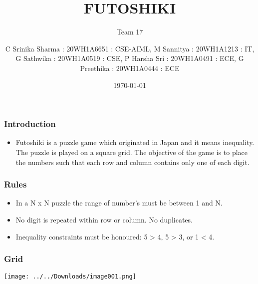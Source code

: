 \documentclass[14pt]{beamer}
\title{FUTOSHIKI}
\subtitle{Team 17}
\date{\today}
\author[14pt]{C Srinika Sharma : 20WH1A6651 : CSE-AIML, M Sannitya : 20WH1A1213 : IT, G Sathwika : 20WH1A0519 : CSE, P Harsha Sri : 20WH1A0491 : ECE, G Preethika : 20WH1A0444 : ECE}
\begin{document}
  
  \begin{frame}
        \titlepage
    \end{frame}
  
  \begin{frame}
	\frametitle{Introduction}
        
	\begin{itemize}
	    \item Futoshiki is a puzzle game which originated in Japan and it means inequality. The puzzle is played on a square grid. The objective of the game is to place the numbers such that each row and column contains only one of each digit.
	\end{itemize}
	
  \end{frame}
   \begin{frame}
	\frametitle{Rules}

	\begin{itemize}
	    \item In a N x N puzzle the range of number's must be between 1 and N.  
	\end{itemize}

	\begin{itemize}
	    \item No digit is repeated within row or column. No duplicates. 
	\end{itemize}

	\begin{itemize}
	    \item Inequality constraints must be honoured: 5 > 4, 5 > 3, or 1 < 4.
	\end{itemize}
  \end{frame}
 \begin{frame}
	\frametitle{Grid}
        
	\texttt{[image: ../../Downloads/image001.png]}
	
  \end{frame}
   
 
\end{document}
